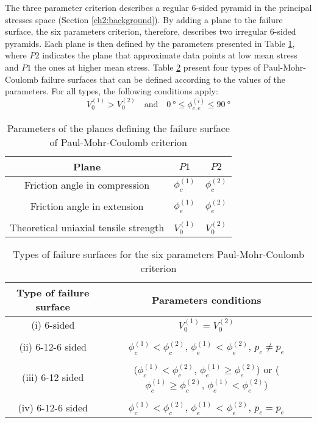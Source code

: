 The three parameter criterion describes a regular 6-sided pyramid in the principal stresses space (Section \ref{ch2:background}). By adding a plane to the failure surface, the six parameters criterion, therefore, describes two irregular 6-sided pyramids. Each plane is then defined by the parameters presented in Table \ref{tb5:pmc6p_planeparam}, where $P2$ indicates the plane that approximate data points at low mean stress and $P1$ the ones at higher mean stress. Table \ref{tb5:pmc6p_pyramids} present four types of Paul-Mohr-Coulomb failure surfaces that can be defined according to the values of the parameters. For all types, the following conditions apply: 
\begin{equation}
    V_0^{(1)} > V_0^{(2)} \quad \textrm{and} \quad \SI{0}{\degree} \leq \phi_{c,e}^{(i)} \leq \SI{90}{\degree}
\end{equation}

\begin{table}
    \centering 
    \captionsetup{justification=centering}
    \caption{Parameters of the planes defining the failure surface of Paul-Mohr-Coulomb criterion}
    \begin{tabular}{ccc}
        \hline 
        Plane & $P1$ & $P2$  \\
        \hline
        \hline
        Friction angle in compression & $\phi_{c}^{(1)}$ & $\phi_{c}^{(2)}$ \\
        \\
        Friction angle in extension & $\phi_{e}^{(1)}$ & $\phi_{e}^{(2)}$ \\ 
        \\
        Theoretical uniaxial tensile strength & $V_0^{(1)}$ & $V_0^{(2)}$ \\
        \hline
    \end{tabular}
    \label{tb5:pmc6p_planeparam}
\end{table}

\begin{table}
    \centering
    \captionsetup{justification=centering}
    \caption{Types of failure surfaces for the six parameters Paul-Mohr-Coulomb criterion}
    \begin{tabular}{cc}
        \hline 
        Type of failure surface & Parameters conditions   \\
        \hline
        \hline
        (i) 6-sided & $V_0^{(1)} = V_0^{(2)}$ \\
        \\
        (ii) 6-12-6 sided & $\phi_{c}^{(1)} < \phi_{c}^{(2)}$, $\phi_{e}^{(1)}$ < $\phi_{e}^{(2)}$, $p_c \neq p_e$\\ 
        \\
        (iii) 6-12 sided & ($\phi_{c}^{(1)} < \phi_{c}^{(2)}$, $\phi_{e}^{(1)} \geq \phi_{e}^{(2)}$) or ($\phi_{c}^{(1)} \geq \phi_{c}^{(2)}$, $\phi_{e}^{(1)} < \phi_{e}^{(2)}$)\\
        \\
        (iv) 6-12-6 sided & $\phi_{c}^{(1)} < \phi_{c}^{(2)}$, $\phi_{e}^{(1)}$ < $\phi_{e}^{(2)}$, $p_c = p_e$\\ 
        \hline
    \end{tabular}
    \label{tb5:pmc6p_pyramids}
\end{table}

